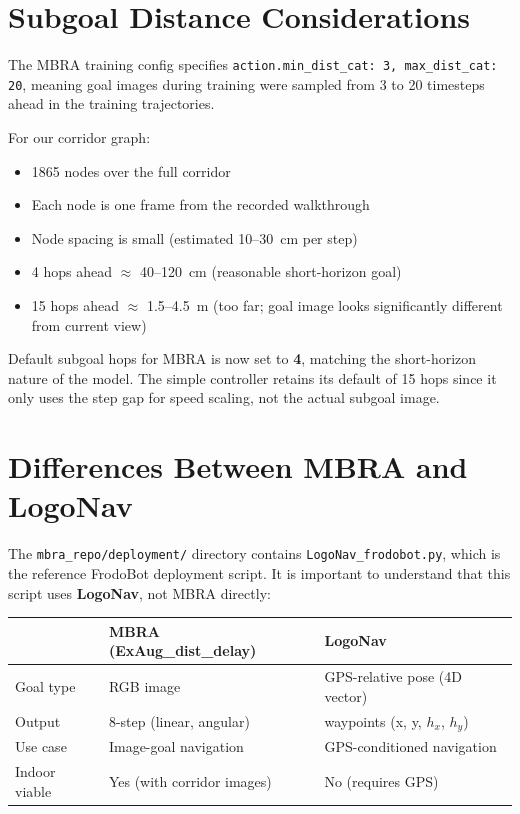 \documentclass[11pt,a4paper]{article}
\begin{document}
\section{Subgoal Distance Considerations}

The MBRA training config specifies \texttt{action.min\_dist\_cat: 3,
max\_dist\_cat: 20}, meaning goal images during training were sampled from
3 to 20 timesteps ahead in the training trajectories.

For our corridor graph:
\begin{itemize}[nosep]
  \item 1865 nodes over the full corridor
  \item Each node is one frame from the recorded walkthrough
  \item Node spacing is small (estimated 10--30~cm per step)
  \item 4 hops ahead $\approx$ 40--120~cm (reasonable short-horizon goal)
  \item 15 hops ahead $\approx$ 1.5--4.5~m (too far; goal image looks
    significantly different from current view)
\end{itemize}

Default subgoal hops for MBRA is now set to \textbf{4}, matching the
short-horizon nature of the model.  The simple controller retains its default
of 15 hops since it only uses the step gap for speed scaling, not the actual
subgoal image.

\section{Differences Between MBRA and LogoNav}

The \texttt{mbra\_repo/deployment/} directory contains
\texttt{LogoNav\_frodobot.py}, which is the reference FrodoBot deployment
script.  It is important to understand that this script uses
\textbf{LogoNav}, not MBRA directly:

\begin{center}
\begin{tabular}{lll}
\toprule
& \textbf{MBRA (ExAug\_dist\_delay)} & \textbf{LogoNav} \\
\midrule
Goal type & RGB image & GPS-relative pose (4D vector) \\
Output & 8-step (linear, angular) & waypoints (x, y, $h_x$, $h_y$) \\
Use case & Image-goal navigation & GPS-conditioned navigation \\
Indoor viable & Yes (with corridor images) & No (requires GPS) \\
\bottomrule
\end{tabular}
\end{center}
\end{document}
